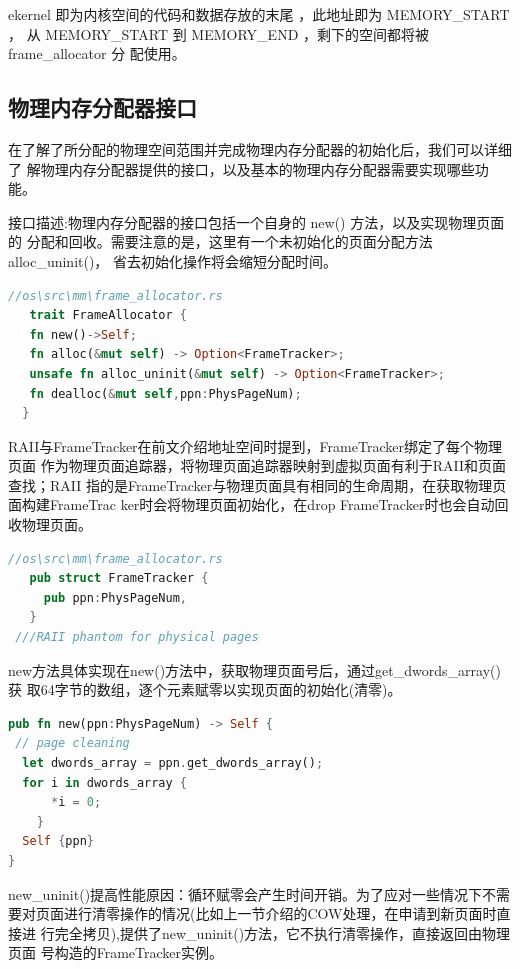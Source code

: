 	ekernel 即为内核空间的代码和数据存放的末尾 ，此地址即为 MEMORY\_START ，
	从 MEMORY\_START 到 MEMORY\_END ，剩下的空间都将被 frame\_allocator 分
	配使用。
	
	\subsection{物理内存分配器接口}
	在了解了所分配的物理空间范围并完成物理内存分配器的初始化后，我们可以详细了
	解物理内存分配器提供的接口，以及基本的物理内存分配器需要实现哪些功能。
	
	接口描述:物理内存分配器的接口包括一个自身的 new() 方法，以及实现物理页面的
	分配和回收。需要注意的是，这里有一个未初始化的页面分配方法alloc\_uninit()，
	省去初始化操作将会缩短分配时间。
\begin{lstlisting}[language=Rust]
 //os\src\mm\frame_allocator.rs
   trait FrameAllocator {
   fn new()->Self;
   fn alloc(&mut self) -> Option<FrameTracker>;
   unsafe fn alloc_uninit(&mut self) -> Option<FrameTracker>;
   fn dealloc(&mut self,ppn:PhysPageNum);
  }
\end{lstlisting}
    
    RAII与FrameTracker在前文介绍地址空间时提到，FrameTracker绑定了每个物理页面
    作为物理页面追踪器，将物理页面追踪器映射到虚拟页面有利于RAII和页面查找；RAII
    指的是FrameTracker与物理页面具有相同的生命周期，在获取物理页面构建FrameTrac
    ker时会将物理页面初始化，在drop FrameTracker时也会自动回收物理页面。
    
    \begin{lstlisting}[language=Rust]
 //os\src\mm\frame_allocator.rs
   pub struct FrameTracker {
     pub ppn:PhysPageNum,
   }
 ///RAII phantom for physical pages
    \end{lstlisting}

    new方法具体实现在new()方法中，获取物理页面号后，通过get\_dwords\_array()获
    取64字节的数组，逐个元素赋零以实现页面的初始化(清零)。
    
\begin{lstlisting}[language=Rust]
 pub fn new(ppn:PhysPageNum) -> Self {
 // page cleaning
  let dwords_array = ppn.get_dwords_array();
  for i in dwords_array {
	  *i = 0;
	}
  Self {ppn}
}
\end{lstlisting}
    
    new\_uninit()提高性能原因：循环赋零会产生时间开销。为了应对一些情况下不需
    要对页面进行清零操作的情况(比如上一节介绍的COW处理，在申请到新页面时直接进
    行完全拷贝),提供了new\_uninit()方法，它不执行清零操作，直接返回由物理页面
    号构造的FrameTracker实例。
    

